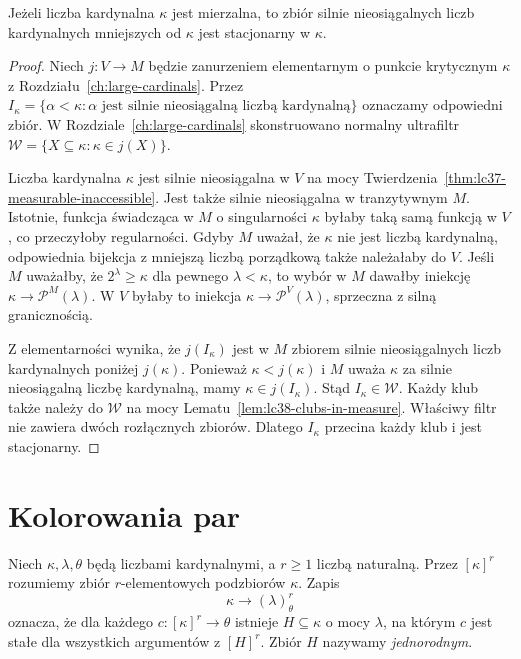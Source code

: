 \begin{twierdzenie}
\label{thm:lc38-measurable-mahlo}
Jeżeli liczba kardynalna $\kappa$ jest mierzalna,
to zbiór silnie nieosiągalnych
liczb kardynalnych mniejszych od $\kappa$
jest stacjonarny w $\kappa$.
\end{twierdzenie}
\begin{proof}
Niech $j:V\to M$ będzie
zanurzeniem elementarnym
o punkcie krytycznym $\kappa$
z Rozdziału~\ref{ch:large-cardinals}.
Przez
$I_\kappa=\{\alpha<\kappa:
\alpha\text{ jest silnie nieosiągalną liczbą kardynalną}\}$
oznaczamy odpowiedni zbiór.
W Rozdziale~\ref{ch:large-cardinals}
skonstruowano normalny ultrafiltr
$\mathcal W=\{X\subseteq\kappa:
                        \kappa\in j(X)\}$.

Liczba kardynalna $\kappa$ jest silnie
nieosiągalna w $V$ na mocy
Twierdzenia~\ref{thm:lc37-measurable-inaccessible}.
Jest także silnie nieosiągalna
w tranzytywnym $M$.
Istotnie, funkcja świadcząca
w $M$ o singularności $\kappa$
byłaby taką samą funkcją w $V$,
co przeczyłoby regularności.
Gdyby $M$ uważał, że $\kappa$
nie jest liczbą kardynalną, odpowiednia
bijekcja z mniejszą liczbą
porządkową także należałaby do $V$.
Jeśli $M$ uważałby, że
$2^\lambda\ge\kappa$ dla
pewnego $\lambda<\kappa$,
to wybór w $M$ dawałby iniekcję
$\kappa\to\mathcal P^M(\lambda)$.
W $V$ byłaby to iniekcja
$\kappa\to\mathcal P^V(\lambda)$,
sprzeczna z silną granicznością.

Z elementarności wynika, że
$j(I_\kappa)$ jest w $M$
zbiorem silnie nieosiągalnych
liczb kardynalnych poniżej $j(\kappa)$.
Ponieważ $\kappa<j(\kappa)$
i $M$ uważa $\kappa$ za
silnie nieosiągalną liczbę kardynalną,
mamy $\kappa\in j(I_\kappa)$.
Stąd $I_\kappa\in\mathcal W$.
Każdy klub także należy do
$\mathcal W$ na mocy
Lematu~\ref{lem:lc38-clubs-in-measure}.
Właściwy filtr nie zawiera
dwóch rozłącznych zbiorów.
Dlatego $I_\kappa$ przecina
każdy klub i jest stacjonarny.
\end{proof}

\section{Kolorowania par}

\begin{definicja}
\label{def:lc38-partition}
Niech $\kappa,\lambda,\theta$
będą liczbami kardynalnymi, a $r\ge1$
liczbą naturalną.
Przez $[\kappa]^r$ rozumiemy
zbiór $r$-elementowych
podzbiorów $\kappa$.
Zapis
\[
 \kappa\longrightarrow(\lambda)^r_\theta
\]
oznacza, że dla każdego
$c:[\kappa]^r\to\theta$
istnieje $H\subseteq\kappa$
o mocy $\lambda$, na którym
$c$ jest stałe dla wszystkich
argumentów z $[H]^r$.
Zbiór $H$ nazywamy
\emph{jednorodnym}.
\end{definicja}

